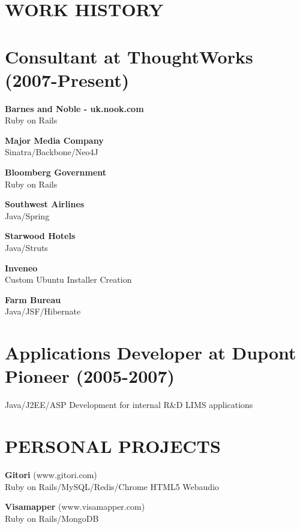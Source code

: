 \documentclass{res}
\begin{document}
 


\address{udit.manektala.com \\  uditmanektala@gmail.com \\  (515) 770-2500}        
                                  
\begin{resume}

\section{WORK HISTORY}          
\section {Consultant at ThoughtWorks (2007-Present)}
{\bf Barnes and Noble - uk.nook.com}
\\Ruby on Rails

{\bf Major Media Company}
\\Sinatra/Backbone/Neo4J

{\bf Bloomberg Government}
\\Ruby on Rails

{\bf Southwest Airlines}
\\Java/Spring

{\bf Starwood Hotels}
\\Java/Struts

{\bf Inveneo}
\\Custom Ubuntu Installer Creation

{\bf Farm Bureau}
\\Java/JSF/Hibernate
 
\section {Applications Developer at Dupont Pioneer (2005-2007)}
Java/J2EE/ASP Development for internal R\&D LIMS applications

\section{PERSONAL PROJECTS}          
    {\bf Gitori} (www.gitori.com)
     \\Ruby on Rails/MySQL/Redis/Chrome HTML5 Webaudio

    {\bf Visamapper} (www.visamapper.com)
    \\Ruby on Rails/MongoDB
 

\end{resume}
\end{document}
